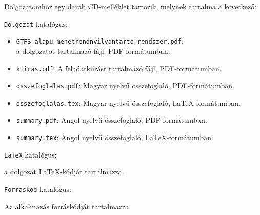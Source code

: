 
Dolgozatomhoz egy darab CD-melléklet tartozik, melynek tartalma a következő:

\bigskip

\noindent \texttt{Dolgozat} katalógus:

\begin{itemize}
\item \texttt{GTFS-alapu\_menetrendnyilvantarto-rendszer.pdf}: \\ a dolgozatot tartalmazó fájl, PDF-formátumban.
\item \texttt{kiiras.pdf}: A feladatkiírást tartalmazó fájl, PDF-formátumban.
\item \texttt{osszefoglalas.pdf}: Magyar nyelvű összefoglaló, PDF-formátumban.
\item \texttt{osszefoglalas.tex}: Magyar nyelvű összefoglaló, \LaTeX-formátumban.
\item \texttt{summary.pdf}: Angol nyelvű összefoglaló, PDF-formátumban.
\item \texttt{summary.tex}: Angol nyelvű összefoglaló, \LaTeX-formátumban.
\end{itemize}

\bigskip

\noindent \texttt{LaTeX} katalógus:

a dolgozat \LaTeX-kódját tartalmazza.

\bigskip

\noindent \texttt{Forraskod} katalógus:

Az alkalmazás forráskódját tartalmazza.
